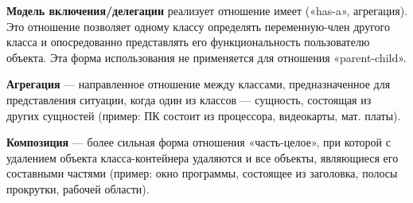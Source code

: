 \documentclass[a4paper,12pt,oneside]{extbook}
\begin{document}
\textbf{Модель включения/делегации} реализует отношение имеет («has-a», агрегация). Это отношение позволяет одному классу определять переменную-член другого класса и опосредованно представлять его функциональность пользователю объекта. Эта форма использования не применяется для отношения «parent-child».

\textbf{Агрегация} — направленное отношение между классами, предназначенное для представления ситуации, когда один из классов — сущность, состоящая из других сущностей (пример: ПК состоит из процессора, видеокарты, мат. платы).

\textbf{Композиция} — более сильная форма отношения «часть-целое», при которой с удалением объекта класса-контейнера удаляются и все объекты, являющиеся его составными частями (пример: окно программы, состоящее из заголовка, полосы прокрутки, рабочей области).
\end{document}

